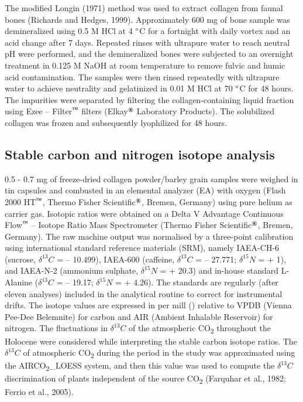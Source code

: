 \documentclass[5p]{elsarticle} %
\begin{document}
The modified Longin (1971) method was used to extract collagen from faunal bones (Richards and Hedges, 1999). Approximately 600 mg of bone sample was demineralized using 0.5 M HCl at 4 \(\text{\textdegree}\)C for a fortnight with daily vortex and an acid change after 7 days. Repeated rinses with ultrapure water to reach neutral pH were performed, and the demineralized bones were subjected to an overnight treatment in 0.125 M NaOH at room temperature to remove fulvic and humic acid contamination. The samples were then rinsed repeatedly with ultrapure water to achieve neutrality and gelatinized in 0.01 M HCl at 70 \(\text{\textdegree}\)C for 48 hours. The impurities were separated by filtering the collagen-containing liquid fraction using Ezee -- Filter\(^\text{\texttrademark}\) filters (Elkay\(^\text{\textregistered}\) Laboratory Products). The solubilized collagen was frozen and subsequently lyophilized for 48 hours.

\hypertarget{stable-carbon-and-nitrogen-isotope-analysis}{%
\subsection{Stable carbon and nitrogen isotope analysis}\label{stable-carbon-and-nitrogen-isotope-analysis}}

0.5 - 0.7 mg of freeze-dried collagen powder/barley grain samples were weighed in tin capsules and combusted in an elemental analyzer (EA) with oxygen (Flash 2000 HT\(^\text{\texttrademark}\), Thermo Fisher Scientific\(^\text{\textregistered}\), Bremen, Germany) using pure helium as carrier gas. Isotopic ratios were obtained on a Delta V Advantage Continuous Flow\(^\text{\texttrademark}\) -- Isotope Ratio Mass Spectrometer (Thermo Fisher Scientific\(^\text{\textregistered}\), Bremen, Germany). The raw machine output was normalised by a three-point calibration using international standard reference materials (SRM), namely IAEA-CH-6 (sucrose, \(\delta ^{13}C\) = -- 10.499\permil), IAEA-600 (caffeine, \(\delta ^{13}C\) = -- 27.771\permil; \(\delta ^{15}N\) = + 1\permil), and IAEA-N-2 (ammonium sulphate, \(\delta ^{15}N\) = + 20.3\permil) and in-house standard L-Alanine (\(\delta ^{13}C\) = -- 19.17\permil; \(\delta ^{15}N\) = + 4.26\permil). The standards are regularly (after eleven analyses) included in the analytical routine to correct for instrumental drifts. The isotope values are expressed in per mill (\permil) relative to VPDB (Vienna Pee-Dee Belemnite) for carbon and AIR (Ambient Inhalable Reservoir) for nitrogen. The fluctuations in \(\delta ^{13}C\) of the atmospheric CO\textsubscript{2} throughout the Holocene were considered while interpreting the stable carbon isotope ratios. The \(\delta ^{13}C\) of atmospheric CO\textsubscript{2} during the period in the study was approximated using the AIRCO\textsubscript{2}\_LOESS system, and then this value was used to compute the \(\delta ^{13}C\) discrimination of plants independent of the source CO\textsubscript{2} (Farquhar et al., 1982; Ferrio et al., 2005).
\end{document}
